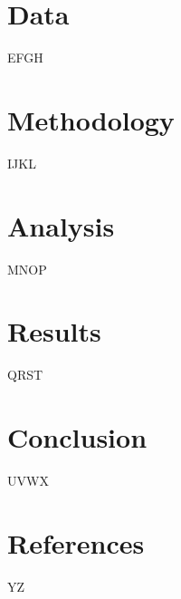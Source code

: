 \documentclass[12pt]{revtex4}
\begin{document}
\pagebreak
\section{Data}
EFGH

\pagebreak
\section{Methodology}
IJKL

\pagebreak
\section{Analysis}
MNOP

\pagebreak
\section{Results}
QRST

\pagebreak
\section{Conclusion}
UVWX

\pagebreak
\section{References}
YZ
\end{document}
